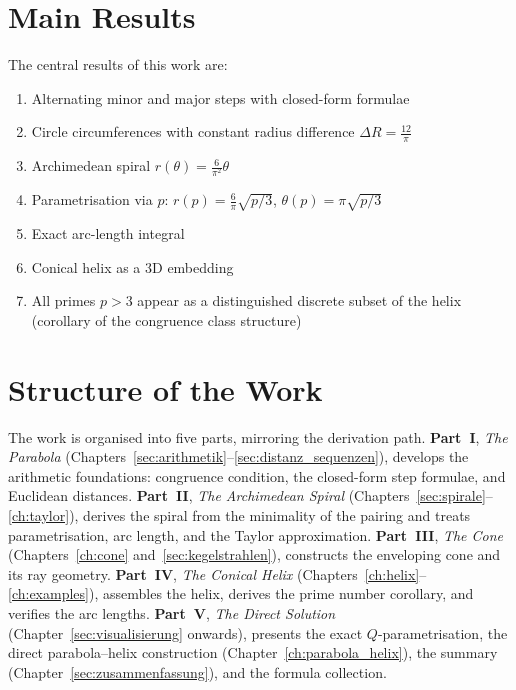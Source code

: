 \clearpage

\section*{Main Results}

The central results of this work are:
\begin{enumerate}
\item Alternating minor and major steps with closed-form formulae
\item Circle circumferences with constant radius difference $\Delta R = \frac{12}{\pi}$
\item Archimedean spiral $r(\theta) = \frac{6}{\pi^2}\theta$
\item Parametrisation via $p$: $r(p)=\frac{6}{\pi}\sqrt{p/3}$, $\theta(p)=\pi\sqrt{p/3}$
\item Exact arc-length integral
\item Conical helix as a 3D embedding
\item All primes $p>3$ appear as a distinguished discrete subset of the helix (corollary of the congruence class structure)
\end{enumerate}

\section*{Structure of the Work}

The work is organised into five parts, mirroring the derivation path.
\textbf{Part~I}, \emph{The Parabola}
(Chapters~\ref{sec:arithmetik}--\ref{sec:distanz_sequenzen}), develops
the arithmetic foundations: congruence condition, the closed-form step
formulae, and Euclidean distances. \textbf{Part~II}, \emph{The
Archimedean Spiral} (Chapters~\ref{sec:spirale}--\ref{ch:taylor}),
derives the spiral from the minimality of the pairing and treats
parametrisation, arc length, and the Taylor approximation.
\textbf{Part~III}, \emph{The Cone} (Chapters~\ref{ch:cone}
and~\ref{sec:kegelstrahlen}), constructs the enveloping cone and its ray
geometry. \textbf{Part~IV}, \emph{The Conical Helix}
(Chapters~\ref{ch:helix}--\ref{ch:examples}), assembles the helix,
derives the prime number corollary, and verifies the arc lengths.
\textbf{Part~V}, \emph{The Direct Solution}
(Chapter~\ref{sec:visualisierung} onwards), presents the exact
$Q$-parametrisation, the direct parabola--helix construction
(Chapter~\ref{ch:parabola_helix}), the summary
(Chapter~\ref{sec:zusammenfassung}), and the formula collection.

